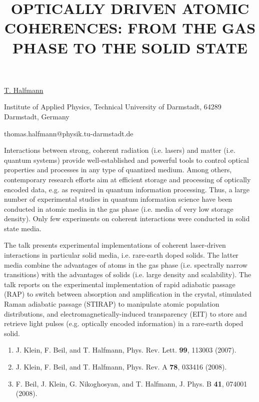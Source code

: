 \title{OPTICALLY DRIVEN ATOMIC COHERENCES: FROM THE GAS PHASE TO THE SOLID STATE}

\underline{T. Halfmann} 

{\normalsize{\vspace{-4mm}
Institute of Applied Physics, Technical University of Darmstadt,
64289 Darmstadt, Germany

\email thomas.halfmann@physik.tu-darmstadt.de}}

Interactions between strong, coherent radiation (i.e. lasers) and
matter (i.e. quantum systems) provide well-established and powerful
tools to control optical properties and processes in any type of
quantized medium. Among others, contemporary research efforts aim at
efficient storage and processing of optically encoded data, e.g. as
required in quantum information processing. Thus, a large number of
experimental studies in quantum information science have been
conducted in atomic media in the gas phase (i.e. media of very low
storage density). Only few experiments on coherent interactions were
conducted in solid state media.

The talk presents experimental implementations of coherent
laser-driven interactions in particular solid media, i.e. rare-earth
doped solids. The latter media combine the advantages of atoms in
the gas phase (i.e. spectrally narrow transitions) with the
advantages of solids (i.e. large density and scalability). The talk
reports on the experimental implementation of rapid adiabatic
passage (RAP) to switch between absorption and amplification in the
crystal, stimulated Raman adiabatic passage (STIRAP) to manipulate
atomic population distributions, and electromagnetically-induced
transparency (EIT) to store and retrieve light pulses (e.g.
optically encoded information) in a rare-earth doped solid.

\vspace{-4mm} {\normalsize \begin{enumerate}
\item J. Klein, F. Beil, and T. Halfmann, %
Phys. Rev. Lett. \textbf{99}, 113003 (2007).
\item J. Klein, F. Beil, and T. Halfmann, %
Phys. Rev. A \textbf{78}, 033416 (2008).
\item F. Beil, J. Klein, G. Nikoghosyan, and T. Halfmann, %
J. Phys. B \textbf{41}, 074001 (2008).
\end{enumerate}
}

\vspace{\baselineskip}